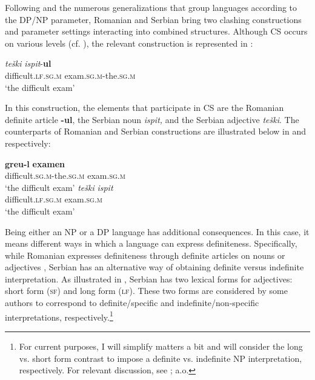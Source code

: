 \documentclass[output=paper,hidelinks,newtxmath,]{langscibook}
\begin{document}
	\z
\z

\noindent Following \citet{Boskovic2008,Boskovic2012} and the numerous generalizations that group languages according to the DP/NP parameter, Romanian and Serbian bring two clashing constructions and parameter settings interacting into combined structures. Although CS occurs on various levels (cf. \citealt{Petroj}), the relevant construction is represented in :

\ea \label{15:ex10}
\gll  \textit{teški} \textit{ispit}{}-\textbf{ul}\\
     difficult.\textsc{lf.sg.m} exam\textsc{.sg.m}-the\textsc{.sg.m}\\
     \glt `the difficult exam'
\z

\noindent In this construction, the elements that participate in CS are the Romanian definite article \textbf{-ul}, the Serbian noun \textit{ispit,} and the Serbian adjective \textit{teški}. The counterparts of Romanian and Serbian constructions are illustrated below in  and  respectively:

\ea \label{15:ex11}
	\ea\label{15:ex11a}
    \gll \textbf{greu-l} \textbf{examen}\\          
        difficult\textsc{.sg.m}-the\textsc{.sg.m} exam\textsc{.sg.m}\\
        \glt `the difficult exam'
	\ex\label{15:ex11b}
    \gll \textit{teški} \textit{ispit}\\
         difficult\textsc{.lf.sg.m} exam\textsc{.sg.m}\\ 
         \glt `the difficult exam'
	\z
\z

\noindent Being either an NP or a DP language has additional consequences. In this case, it means different ways in which a language can express definiteness. Specifically, while Romanian expresses definiteness through definite articles on nouns  or adjectives , Serbian has an alternative way of obtaining definite versus indefinite interpretation. As illustrated in , Serbian has two lexical forms for adjectives: short form (\textsc{sf}) and long form (\textsc{lf}). These two forms are considered by some authors \citep{Aljovic2002,Despic2011,Talic2014} to correspond to definite/specific  and indefinite/non-specific  interpretations, respectively.\footnote{\label{15:fn6}For current purposes, I will simplify matters a bit and will consider the long vs. short form contrast to impose a definite vs. indefinite NP interpretation, respectively. For relevant discussion, see \citet{Aljovic2002,Despic2011,Talic2014,Stankovic2015}; a.o.}
\end{document}
